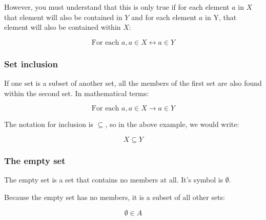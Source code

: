 However, you must understand that this is only true if for each element $a$ in
$X$ that element will also be contained in $Y$ and for each element $a$ in Y,
that element will also be contained within $X$:


\begin{dmath}
	\textrm{For each }a, a \in X \leftrightarrow a \in Y
\end{dmath}

\subsubsection{Set inclusion}

If one set is a subset of another set, all the members of the first set are also
found within the second set. In mathematical terms:

\begin{dmath}
	{\textrm{For each }a, a \in X \rightarrow a \in Y}
\end{dmath}

The notation for inclusion is $\subseteq$, so in the above example, we would
write:


\begin{dmath}
	X \subseteq Y
\end{dmath}

\subsubsection{The empty set}
\label{subsubsec:empty_set}

The empty set is a set that contains no members at all. It's symbol is
$\emptyset$.

Because the empty set has no members, it is a subset of all other sets:


\begin{dmath}
	\emptyset \in A
\end{dmath}


